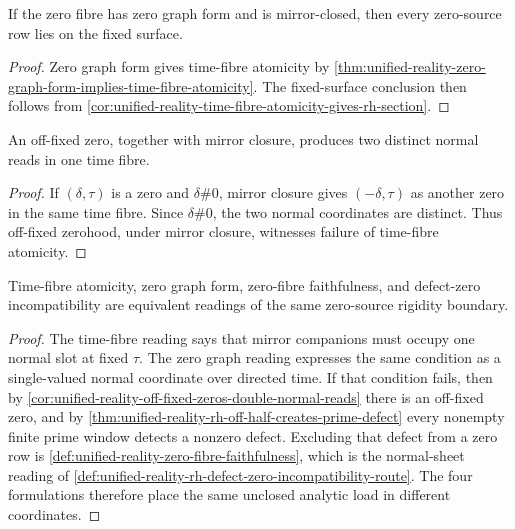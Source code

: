 \begin{corollary}
\label{cor:unified-reality-zero-graph-form-fixed-surface}
If the zero fibre has zero graph form and is mirror-closed, then every
zero-source row lies on the fixed surface.
\end{corollary}

\begin{proof}
Zero graph form gives time-fibre atomicity by
\autoref{thm:unified-reality-zero-graph-form-implies-time-fibre-atomicity}.
The fixed-surface conclusion then follows from
\autoref{cor:unified-reality-time-fibre-atomicity-gives-rh-section}.
\end{proof}

\begin{corollary}
\label{cor:unified-reality-off-fixed-zeros-double-normal-reads}
An off-fixed zero, together with mirror closure, produces two distinct
normal reads in one time fibre.
\end{corollary}

\begin{proof}
If $(\delta,\tau)$ is a zero and $\delta\#0$, mirror closure gives
$(-\delta,\tau)$ as another zero in the same time fibre.  Since
$\delta\#0$, the two normal coordinates are distinct.  Thus off-fixed
zerohood, under mirror closure, witnesses failure of time-fibre
atomicity.
\end{proof}

\begin{theorem}
\label{thm:unified-reality-time-fibre-atomicity-slot-form-defect-rigidity}
Time-fibre atomicity, zero graph form, zero-fibre faithfulness, and
defect-zero incompatibility are equivalent readings of the same
zero-source rigidity boundary.
\end{theorem}

\begin{proof}
The time-fibre reading says that mirror companions must occupy one
normal slot at fixed $\tau$.  The zero graph reading expresses the same
condition as a single-valued normal coordinate over directed time.  If
that condition fails, then by
\autoref{cor:unified-reality-off-fixed-zeros-double-normal-reads} there
is an off-fixed zero, and by
\autoref{thm:unified-reality-rh-off-half-creates-prime-defect} every
nonempty finite prime window detects a nonzero defect.  Excluding that
defect from a zero row is
\autoref{def:unified-reality-zero-fibre-faithfulness}, which is the
normal-sheet reading of
\autoref{def:unified-reality-rh-defect-zero-incompatibility-route}.  The
four formulations therefore place the same unclosed analytic load in
different coordinates.
\end{proof}
